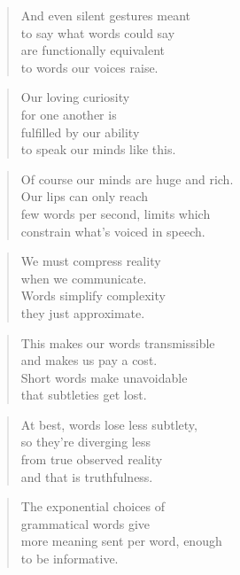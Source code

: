 \documentclass[10pt,a4paper]{article}
\begin{document}
\begin{paracol}{2}
\begin{verse}
And even silent gestures meant\\
to say what words could say\\
are functionally equivalent\\
to words our voices raise.
\end{verse}

\begin{verse}
Our loving curiosity\\
for one another is\\
fulfilled by our ability\\
to speak our minds like this.
\end{verse}

\begin{verse}
Of course our minds are huge and rich.\\
Our lips can only reach\\
few words per second, limits which\\
constrain what’s voiced in speech.
\end{verse}

\begin{verse}
We must compress reality\\
when we communicate.\\
Words simplify complexity\\
they just approximate.
\end{verse}

\begin{verse}
This makes our words transmissible\\
and makes us pay a cost.\\
Short words make unavoidable\\
that subtleties get lost.
\end{verse}

\begin{verse}
At best, words lose less subtlety,\\
so they’re diverging less\\
from true observed reality\\
and that is truthfulness.
\end{verse}

\begin{verse}
The exponential choices of\\
grammatical words give\\
more meaning sent per word, enough\\
to be informative.
\end{verse}


\end{paracol}
\end{document}
